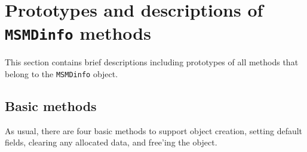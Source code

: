 \par
\section{Prototypes and descriptions of {\tt MSMDinfo} methods}
\label{section:MSMDinfo:proto}
\par
This section contains brief descriptions including prototypes
of all methods that belong to the {\tt MSMDinfo} object.
\par
\subsection{Basic methods}
\label{subsection:MSMDinfo:proto:basics}
\par
As usual, there are four basic methods to support object creation,
setting default fields, clearing any allocated data, and free'ing
the object.
\par
